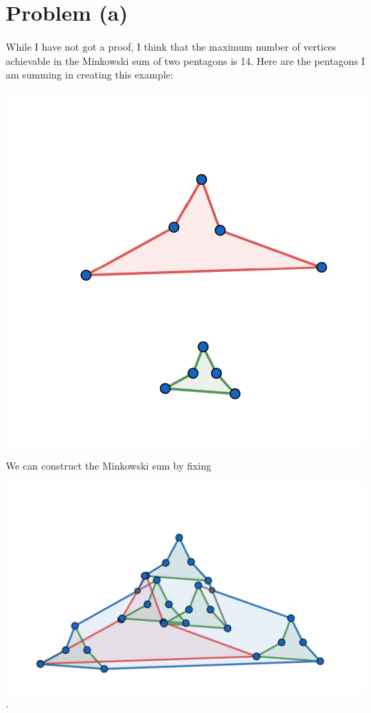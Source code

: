 \documentclass[12pt]{article}
\theoremstyle{definition}
\begin{document}
\section{Problem (a)}

While I have not got a proof, I think that the maximum number of vertices achievable in the Minkowski sum of two pentagons is 14. Here are the pentagons I am summing in creating this example:


\includegraphics[scale=1]{polygons.png} 

We can construct the Minkowski sum by fixing 

\includegraphics[scale=1]{minkowski_sums.png}.
\end{document}
